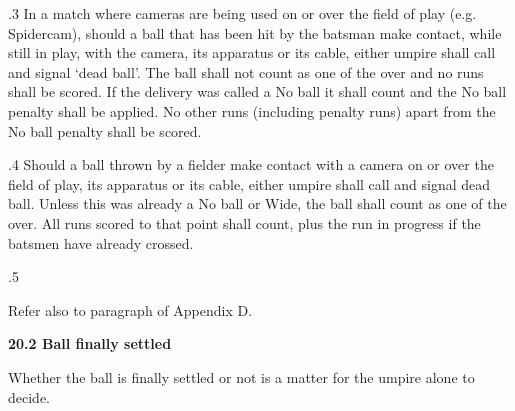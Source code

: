\documentclass[12pt]{article}
\begin{document}
\vspace{\baselineskip}
\begin{adjustwidth}{0.5in}{0.01in}
{\fontsize{9pt}{10.8pt}.3 \tabto{0.49in} In a match where cameras are being used on or over the field of play (e.g. Spidercam), should a ball that has been hit by the batsman make contact, while still in play, with the camera, its apparatus or its cable, either umpire shall call and signal ‘dead ball’. The ball shall not count as one of the over and no runs shall be scored. If the delivery was called a No ball it shall count and the No ball penalty shall be applied. No other runs (including penalty runs) apart from the No ball penalty shall be scored.\par}\par

\end{adjustwidth}


\vspace{\baselineskip}
\begin{adjustwidth}{0.5in}{0.07in}
{\fontsize{9pt}{10.8pt}.4 \tabto{0.49in} Should a ball thrown by a fielder make contact with a camera on or over the field of play, its apparatus or its cable, either umpire shall call and signal dead ball. Unless this was already a No ball or Wide, the ball shall count as one of the over. All runs scored to that point shall count, plus the run in progress if the batsmen have already crossed.\par}\par

\end{adjustwidth}


\vspace{\baselineskip}
{\fontsize{9pt}{10.8pt}.5 \tabto{0.49in} {\fontsize{8pt}{9.6pt}\selectfont Refer also to paragraph of Appendix D.\par}\par}\par


\vspace{\baselineskip}
{\fontsize{11pt}{13.2pt}\selectfont \textbf{20.2 \tabto{0.47in} Ball finally settled}\par}\par


\vspace{\baselineskip}
{\fontsize{9pt}{10.8pt}\selectfont Whether the ball is finally settled or not is a matter for the umpire alone to decide.\par}\par
\end{document}
